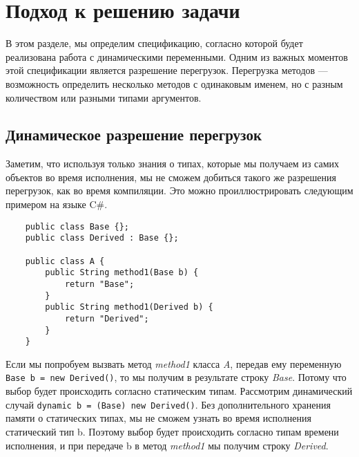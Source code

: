 \section{Подход к решению задачи}



В этом разделе, мы определим спецификацию, согласно которой будет реализована работа с динамическими переменными.  Одним из важных моментов этой спецификации является разрешение перегрузок. Перегрузка методов --- возможность определить несколько методов с одинаковым именем, но с разным количеством или разными типами аргументов.


\subsection{Динамическое разрешение перегрузок}

Заметим, что используя только знания о типах, которые мы получаем из самих объектов во время исполнения, мы не сможем добиться такого же разрешения перегрузок, как во время компиляции. Это можно проиллюстрировать следующим примером на языке C{\#}.

\begin{verbatim}
    public class Base {};
    public class Derived : Base {};
    
    public class A {
        public String method1(Base b) {
            return "Base";
        }
        public String method1(Derived b) {
            return "Derived";
        }
    }
\end{verbatim}

Если мы попробуем вызвать метод \textit{method1} класса \textit{A}, передав ему переменную  \texttt{Base b = new Derived()}, то мы получим в результате строку \textit{Base}. Потому что выбор будет происходить согласно статическим типам. Рассмотрим динамический случай \texttt{dynamic b = (Base) new Derived()}.
Без дополнительного хранения памяти о статических типах, мы не сможем узнать во время исполнения статический тип b. Поэтому выбор будет происходить согласно типам времени исполнения, и при передаче b в метод \textit{method1} мы получим строку \textit{Derived}.

